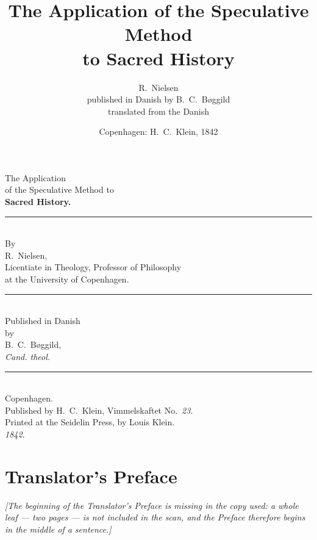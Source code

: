\documentclass[12pt]{book}
\title{\textbf{The Application of the Speculative Method\\ to Sacred History}}
\author{R.\ Nielsen\\[4pt]
  \normalsize published in Danish by B.\ C.\ Bøggild\\[4pt]
  \small translated from the Danish}
\date{Copenhagen: H.\ C.\ Klein, 1842}
\begin{document}
\frontmatter
\maketitle
\thispagestyle{empty}

\tableofcontents

\cleardoublepage
\thispagestyle{empty}
{}
\begin{center}
  {\Large The Application}\\[1.3\baselineskip]
  {\large of the Speculative Method to}\\[1.3\baselineskip]
  {\huge\bfseries Sacred History.}\\[1.1\baselineskip]
  \rule{4em}{0.4pt}\\[1.8\baselineskip]
  By\\[0.9\baselineskip]
  {\Large R.\ Nielsen,}\\[0.4\baselineskip]
  {\small Licentiate in Theology, Professor of Philosophy\\
   at the University of Copenhagen.}\\[1.3\baselineskip]
  \rule{9em}{0.4pt}\\[1.5\baselineskip]
  Published in Danish\\[0.5\baselineskip]
  by\\[0.5\baselineskip]
  {\Large B.\ C.\ Bøggild,}\\[0.35\baselineskip]
  {\small\textit{Cand. theol.}}\\[2.6\baselineskip]
  \rule{13em}{0.4pt}\\[1.6\baselineskip]
  {\large Copenhagen.}\\[0.5\baselineskip]
  {\small Published by H.\ C.\ Klein, Vimmelskaftet No.\ \textit{23}.\\
   Printed at the Seidelin Press, by Louis Klein.\\[0.3\baselineskip]
   \textit{1842}.}
\end{center}

\chapter*{Translator's Preface}
{}

\textit{[The beginning of the Translator's Preface is missing in the copy
used: a whole leaf --- two pages --- is not included in the scan, and the
Preface therefore begins in the middle of a sentence.]}
\end{document}
